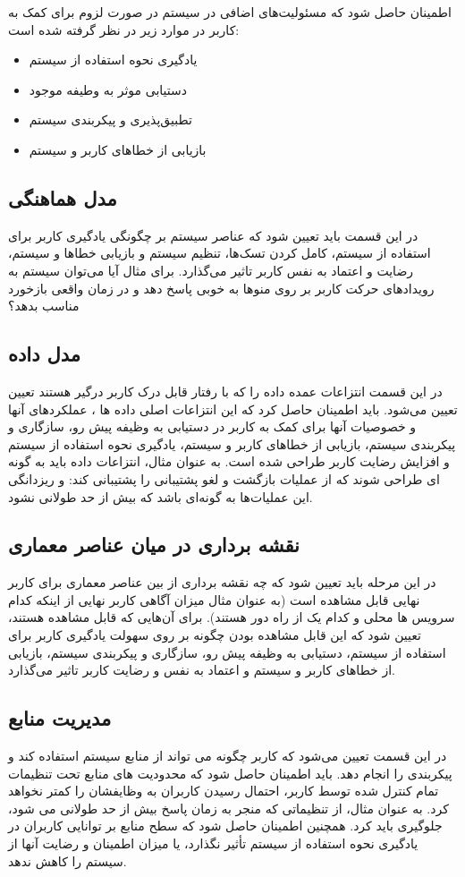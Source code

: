 اطمینان حاصل شود که مسئولیت‌های اضافی در سیستم در صورت لزوم برای کمک به کاربر در موارد زیر در نظر گرفته شده است:
\begin{itemize}
\item
یادگیری نحوه استفاده از سیستم 
\item
دستیابی موثر به وطیفه موجود 
\item
تطبیق‌پذیری و پیکربندی سیستم
\item
بازیابی از خطاهای کاربر و سیستم
\end{itemize}

\subsection{مدل هماهنگی}

در این قسمت باید تعیین شود که عناصر سیستم بر چگونگی یادگیری کاربر برای استفاده از سیستم، کامل کردن تسک‌ها، تنظیم سیستم و بازیابی خطاها و سیستم، رضایت و اعتماد به نفس کاربر تاثیر می‌گذارد.
برای مثال  آیا می‌توان سیستم به رویدادهای حرکت کاربر بر روی منوها به خوبی پاسخ دهد و در زمان واقعی بازخورد مناسب بدهد؟
\subsection{مدل داده}
در این قسمت انتزاعات عمده داده را که با رفتار قابل درک کاربر درگیر هستند تعیین تعیین می‌شود.
باید اطمینان حاصل کرد که این انتزاعات اصلی داده ها ، عملکردهای آنها و خصوصیات آنها برای کمک به کاربر در دستیابی به وظیفه پیش رو، سازگاری و پیکربندی سیستم، بازیابی از خطاهای کاربر و سیستم، یادگیری نحوه استفاده از سیستم و افزایش رضایت کاربر طراحی شده است.
به عنوان مثال، انتزاعات داده باید به گونه ای طراحی شوند که از عملیات بازگشت و لغو پشتیبانی را پشتیبانی کند: و ریزدانگی این عملیات‌ها به گونه‌ای باشد که بیش از حد طولانی نشود.
\subsection{نقشه برداری در میان عناصر معماری}
در این مرحله باید تعیین شود که چه نقشه برداری از بین عناصر معماری برای کاربر نهایی قابل مشاهده است (به عنوان مثال میزان آگاهی کاربر نهایی از اینکه کدام سرویس ها محلی و کدام یک از راه دور هستند).
برای آن‌هایی که قابل مشاهده هستند، تعیین شود که این قابل مشاهده بودن چگونه بر روی سهولت یادگیری کاربر برای استفاده از سیستم، دستیابی به وظیفه پیش رو، سازگاری و پیکربندی سیستم، بازیابی از خطاهای کاربر و سیستم و اعتماد به نفس و رضایت کاربر تاثیر می‌گذارد.
\subsection{مدیریت منابع}
در این قسمت تعیین می‌شود که کاربر چگونه می تواند از منابع سیستم استفاده کند و پیکربندی را انجام دهد.
باید اطمینان حاصل شود که محدودیت های منابع تحت تنظیمات تمام کنترل شده توسط کاربر، احتمال رسیدن کاربران به وظایفشان را کمتر نخواهد کرد. به عنوان مثال، از تنظیماتی که منجر به زمان پاسخ بیش از حد طولانی می شود، جلوگیری باید کرد.
همچنین اطمینان حاصل شود که سطح منابع بر توانایی کاربران در یادگیری نحوه استفاده از سیستم تأثیر نگذارد، یا میزان اطمینان و رضایت آنها از سیستم را کاهش ندهد.
